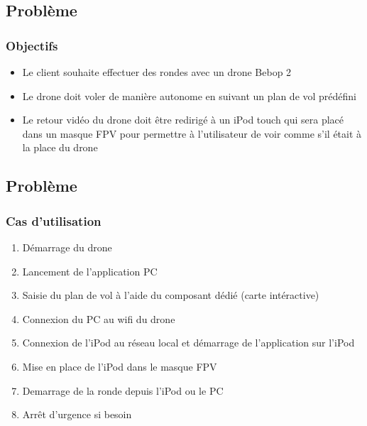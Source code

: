 \documentclass{beamer}
\begin{document}
	\begin{frame}
		\section{Problème}
		\begin{center}
		\frametitle{Objectifs}
		\begin{itemize}
		    \item Le client souhaite effectuer des rondes avec un drone Bebop 2\\
		    \item Le drone doit voler de manière autonome en suivant un plan de vol prédéfini \\
		    \item Le retour vidéo du drone doit être redirigé à un iPod touch qui sera placé dans un masque FPV pour permettre à l'utilisateur de voir comme s'il était à la place du drone\\
		\end{itemize}
		   
		\end{center}
	\end{frame}
	\begin{frame}
		\section{Problème}
		\begin{center}
		\frametitle{Cas d'utilisation}
		\begin{enumerate}
		    \item Démarrage du drone\\
		    \item Lancement de l'application PC\\
		    \item Saisie du plan de vol à l'aide du composant dédié (carte intéractive)\\
		    \item Connexion du PC au wifi du drone
		    \item Connexion de l'iPod au réseau local et démarrage de l'application sur l'iPod
		    \item Mise en place de l'iPod dans le masque FPV
		    \item Demarrage de la ronde depuis l'iPod ou le PC
		    \item Arrêt d'urgence si besoin
		\end{enumerate}
		   
		\end{center}
	\end{frame}
	
\end{document}
